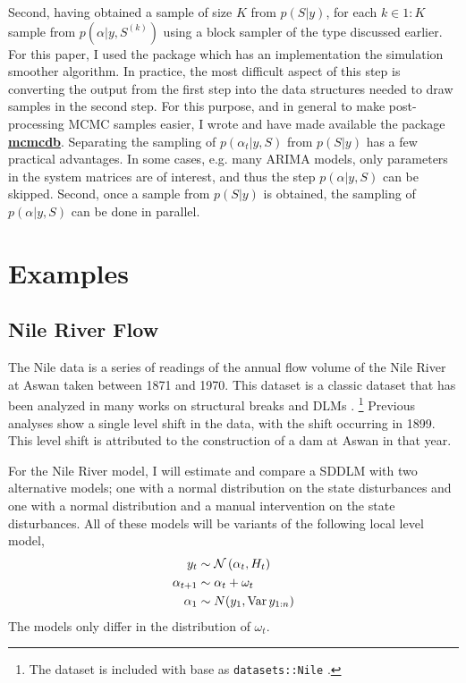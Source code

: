 \documentclass{article}
\begin{document}
Second, having obtained a sample of size $K$ from $p(S | y)$, for each $k \in 1:K$ sample from $p(\alpha | y, S^{(k)})$ using a block sampler of the type discussed earlier.
For this paper, I used the \RLang{} package  \parencite{Helske2012} which has an implementation the \textcite{DurbinKoopman2002} simulation smoother algorithm.
In practice, the most difficult aspect of this step is converting the output from the first step into the data structures needed to draw samples in the second step.
For this purpose, and in general to make post-processing MCMC samples easier, I wrote and have made available the \RLang{} package \href{https://github.com/jrnold/mcmcdb}{\textbf{mcmcdb}}.
Separating the sampling of $p(\alpha_{t} | y, S)$ from $p(S | y)$ has a few practical advantages.
In some cases, e.g. many ARIMA models, only parameters in the system matrices are of interest, and thus the step $p(\alpha | y, S)$ can be skipped.
Second, once a sample from $p(S | y)$ is obtained, the sampling of $p(\alpha | y, S)$ can be done in parallel.


\section{Examples}
\label{sec:examples}

\subsection{Nile River Flow}
\label{sec:nile}

The Nile data is a series of readings of the annual flow volume of the Nile River at Aswan taken between 1871 and 1970.
This dataset is a classic dataset that has been analyzed in many works on structural breaks and DLMs \parencites{Cobb1978}{Balke1993}{JongPenzer1998}{DurbinKoopman2001}{CommandeurKoopmanOoms2011}.%
\footnote{The dataset is included with base \RLang{} as \texttt{datasets::Nile} \parencite{RCT2013}.}
Previous analyses show a single level shift in the data, with the shift occurring in 1899.
This level shift is attributed to the construction of a dam at Aswan in that year.

For the Nile River model, I will estimate and compare a SDDLM with two alternative models; one with a normal distribution on the state disturbances and one with a normal distribution and a manual intervention on the state disturbances.
All of these models will be variants of the following local level model,
\begin{equation}
  \label{eq:21}
  \begin{aligned}[t]
    y_{t} &\sim \mathcal{N}\left(\alpha_{t}, H_{t}\right) \\
    \alpha_{t + 1} &\sim \alpha_{t} + \omega_{t} \\
    \alpha_{1} &\sim N(y_{1}, \operatorname{Var} y_{1:n})
  \end{aligned}
\end{equation}
The models only differ in the distribution of $\omega_{t}$.
\end{document}
